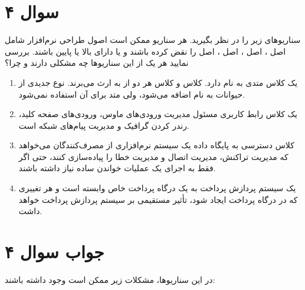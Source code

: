 \section*{سوال ۴}

سناریوهای زیر را در نظر بگیرید. هر سناریو ممکن است اصول طراحی نرم‌افزار شامل اصل
، اصل
، اصل
، اصل
را نقض کرده باشند و یا دارای
بالا یا
پایین باشند. بررسی نمایید هر یک از این سناریوها چه مشکلی دارند و چرا؟

\begin{enumerate}
	\item یک کلاس  متدی به نام  دارد. کلاس  و کلاس  هر دو از  به ارث می‌برند. نوع جدیدی از حیوانات به نام  اضافه می‌شود، ولی متد  برای آن استفاده نمی‌شود.
	\item یک کلاس رابط کاربری مسئول مدیریت ورودی‌های ماوس، ورودی‌های صفحه کلید، رندر کردن گرافیک و مدیریت پیام‌های شبکه است.
	\item کلاس دسترسی به پایگاه داده یک سیستم نرم‌افزاری از مصرف‌کنندگان می‌خواهد که مدیریت تراکنش، مدیریت اتصال و مدیریت خطا را پیاده‌سازی کنند، حتی اگر فقط به اجرای یک عملیات خواندن ساده نیاز داشته باشند.
	\item یک سیستم پردازش پرداخت به یک درگاه پرداخت خاص وابسته است و هر تغییری که در درگاه پرداخت ایجاد شود، تأثیر مستقیمی بر سیستم پردازش پرداخت خواهد داشت.
\end{enumerate}

\section*{جواب سوال ۴}

در این سناریوها، مشکلات زیر ممکن است وجود داشته باشند:

